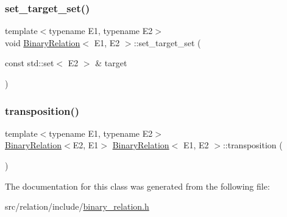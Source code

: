 \mbox{\label{classBinaryRelation_afa844b52bece82c8519bc1f90b0dcef2}} 
\subsubsection{\texorpdfstring{set\+\_\+target\+\_\+set()}{set\_target\_set()}}
{\footnotesize\ttfamily template$<$typename E1, typename E2$>$ \\
void \hyperlink{classBinaryRelation}{Binary\+Relation}$<$ E1, E2 $>$\+::set\+\_\+target\+\_\+set (\begin{DoxyParamCaption}\item[{const std\+::set$<$ E2 $>$ \&}]{target }\end{DoxyParamCaption})\hspace{0.3cm}{\ttfamily [inline]}}

\mbox{\label{classBinaryRelation_af18e09570203d804f5bb36cc5e6da75b}} 
\subsubsection{\texorpdfstring{transposition()}{transposition()}}
{\footnotesize\ttfamily template$<$typename E1, typename E2$>$ \\
\hyperlink{classBinaryRelation}{Binary\+Relation}$<$E2, E1$>$ \hyperlink{classBinaryRelation}{Binary\+Relation}$<$ E1, E2 $>$\+::transposition (\begin{DoxyParamCaption}{ }\end{DoxyParamCaption})\hspace{0.3cm}{\ttfamily [inline]}}



The documentation for this class was generated from the following file\+:\begin{DoxyCompactItemize}
\item 
src/relation/include/\hyperlink{binary__relation_8h}{binary\+\_\+relation.\+h}\end{DoxyCompactItemize}
